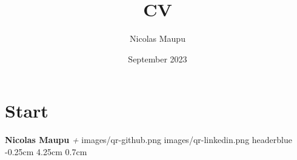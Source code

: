 \documentclass[darkhipster]{hipstercv}
\title{CV}
\author{Nicolas Maupu}
\date{September 2023}
\begin{document}
\section*{Start}

%
%

%
%
\FPsub\result{\thedatetwo}{\thedateone}
\FPsub\result{\thedatetwo}{\thedateone}
\FPdiv{}
\myage

\header
  {\color{headerbluefont} \huge \bfseries Nicolas Maupu}
  {\color{headerbluefont} \emph{\large \langHeaderJobTitle}}
  {\color{headerbluefont} \emph{\FPround{}\myage+ \langHeaderExperience}}
  {images/qr-github.png}
  {images/qr-linkedin.png}
  {headerblue}
  {-0.25cm} %
  {4.25cm} %
  {0.7cm} %



\subsection*{}
\end{document}
